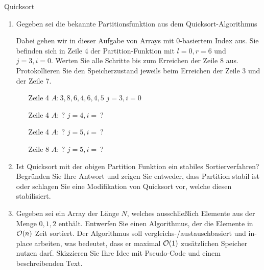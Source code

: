 \documentclass{article}
\begin{document}
\begin{exercise}{Quicksort}
  \begin{enumerate}
    \item
          Gegeben sei die bekannte Partitionsfunktion aus dem Quicksort-Algorithmus
          
          Dabei gehen wir in dieser Aufgabe von Arrays mit 0-basiertem Index aus. Sie befinden sich in Zeile 4 der Partition-Funktion mit $l = 0, r = 6$ und $j = 3, i = 0$. Werten Sie alle Schritte bis zum Erreichen der Zeile 8 aus. Protokollieren Sie den Speicherzustand jeweils beim Erreichen der Zeile 3 und der Zeile 7.
          \begin{itemize}
            \item[Zeile 4] $A: 3, 8, 6, 4, 6, 4, 5$ \hfill $j = 3, i = 0$
            \item[Zeile 4] $A:\ ?$ \hfill $j = 4, i =\ ?$
            \item[Zeile 4] $A:\ ?$ \hfill $j = 5, i =\ ?$
            \item[Zeile 8] $A:\ ?$ \hfill $j = 5, i =\ ?$
          \end{itemize}
    \item Ist Quicksort mit der obigen Partition Funktion ein stabiles Sortierverfahren? Begründen Sie Ihre Antwort und zeigen Sie entweder, dass Partition stabil ist oder schlagen Sie eine Modifikation von Quicksort vor, welche diesen stabilisiert.
    \item Gegeben sei ein Array der Länge $N$, welches ausschließlich Elemente aus der Menge $0,1,2$ enthält. Entwerfen Sie einen Algorithmus, der die Elemente in $\mathcal{O}(n)$ Zeit sortiert. Der Algorithmus soll vergleichs-/austauschbasiert und in-place arbeiten, was bedeutet, dass er maximal $\mathcal{O}(1)$ zusätzlichen Speicher nutzen darf. Skizzieren Sie Ihre Idee mit Pseudo-Code und einem beschreibenden Text.
  \end{enumerate}


\end{exercise}
\end{document}
